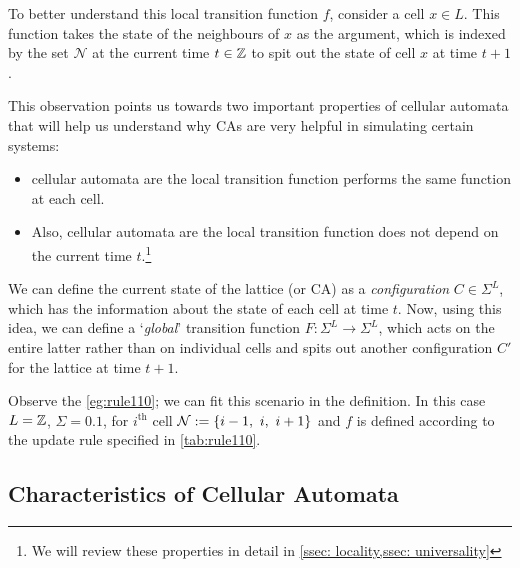 \documentclass[11pt, oneside, listof=totoc]{scrbook}
\begin{document}
To better understand this local transition function \(f\), consider a cell \(x \in L\). This function takes the state of the neighbours of \(x\) as the argument, which is indexed by the set \(\mathcal{N}\) at the current time \(t \in \mathbb Z\) to spit out the state of cell $x$ at time $t + 1$.

\noindent This observation points us towards two important properties of cellular automata that will help us understand why CAs are very helpful in simulating certain systems:

\begin{itemize}
    \item cellular automata are  \ie the local transition function performs the same function at each cell.
    \item Also, cellular automata are  \ie the local transition function does not depend on the current time $t$.\footnote{We will review these properties in detail in \cref{ssec: locality,ssec: universality}}
\end{itemize}

\noindent We can define the current state of the lattice (or CA) as a \emph{configuration} \(C \in \Sigma^{L}\), which has the information about the state of each cell at time \(t\). Now, using this idea, we can define a `\emph{global}' transition function \(F: \Sigma^{L} \to \Sigma^{L}\), which acts on the entire latter rather than on individual cells and spits out another configuration \(C'\) for the lattice at time \(t+1\).

\begin{remark}
    Observe the \cref{eg:rule110}; we can fit this scenario in the definition. In this case \(L = \mathbb Z\), \(\Sigma = \qty{0, 1}\), for $i^{\text{th}}$ cell \(\mathcal{N} := \qty{i-1,~ i,~ i+1}\) and \(f\) is defined according to the update rule specified in \cref{tab:rule110}.
\end{remark}

\pagebreak
\subsection{Characteristics of Cellular Automata}
\end{document}
